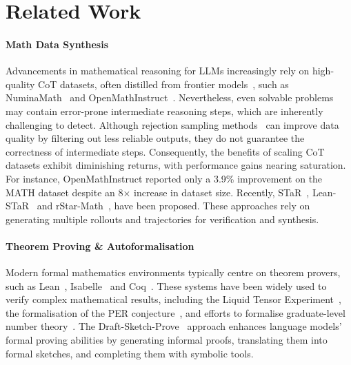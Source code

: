 \section{Related Work}
\label{sec:bibtex}

\paragraph{Math Data Synthesis} Advancements in mathematical reasoning for LLMs increasingly rely on high-quality CoT datasets, often distilled from frontier models~\cite{guo2025deepseek, wang2023mathcoder, gou2023tora, luo2024improve, yu2023metamath, tang2024mathscale}, such as
NuminaMath~\cite{li2024numinamath} and OpenMathInstruct~\cite{toshniwal2024openmathinstruct}. Nevertheless, even solvable problems may contain error-prone intermediate reasoning steps, which are inherently challenging to detect. Although rejection sampling methods~\cite{yuan2023scaling, brown2024large} can improve data quality by filtering out less reliable outputs, they do not guarantee the correctness of intermediate steps. Consequently, the benefits of scaling CoT datasets exhibit diminishing returns, with performance gains nearing saturation. For instance, OpenMathInstruct reported only a 3.9\% improvement on the MATH dataset despite an 8× increase in dataset size. Recently, STaR~\cite{zelikman2022star},
Lean-STaR~\cite{lin2024lean} and rStar-Math~\cite{guan2025rstar}, have been proposed. These approaches rely on generating multiple rollouts and trajectories for verification and synthesis.

\paragraph{Theorem Proving \& Autoformalisation} Modern formal mathematics environments typically centre on theorem provers, such as Lean~\cite{jiang2024leanreasoner, lin2024lean}, Isabelle~\cite{zhou2024don, xin2023lego} and Coq~\cite{huet1997coq}. These systems have been widely used to verify complex mathematical results, including the Liquid Tensor Experiment~\cite{castelvecchi2021mathematicians}, the formalisation of the PER conjecture~\cite{gowers2023conjecture}, and efforts to formalise graduate-level number theory~\cite{eberl2024formalising}.
The Draft-Sketch-Prove~\cite{jiang2022draft} approach enhances language models’ formal proving abilities by generating informal proofs, translating them into formal sketches, and completing them with symbolic tools. 
